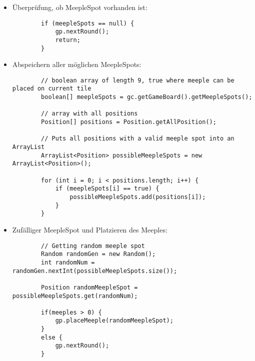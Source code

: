 \begin{itemize}
\begin{itemize}
	\item Überprüfung, ob MeepleSpot vorhanden ist:
	\begin{lstlisting}
		if (meepleSpots == null) {
			gp.nextRound();
			return;
		}
	\end{lstlisting}
	
	\item Abspeichern aller möglichen MeepleSpots:
	\begin{lstlisting}
		// boolean array of length 9, true where meeple can be placed on current tile
		boolean[] meepleSpots = gc.getGameBoard().getMeepleSpots();
		
		// array with all positions
		Position[] positions = Position.getAllPosition();
		
		// Puts all positions with a valid meeple spot into an ArrayList
		ArrayList<Position> possibleMeepleSpots = new ArrayList<Position>();
		
		for (int i = 0; i < positions.length; i++) {
			if (meepleSpots[i] == true) {
				possibleMeepleSpots.add(positions[i]);
			}
		}
	\end{lstlisting}
	
	\item Zufälliger MeepleSpot und Platzieren des Meeples:
	\begin{lstlisting}
		// Getting random meeple spot
		Random randomGen = new Random();
		int randomNum = randomGen.nextInt(possibleMeepleSpots.size());
		
		Position randomMeepleSpot = possibleMeepleSpots.get(randomNum);
		
		if(meeples > 0) {
			gp.placeMeeple(randomMeepleSpot);
		}
		else {
			gp.nextRound();
		}
	\end{lstlisting}
	
	\end{itemize}

\end{itemize}



